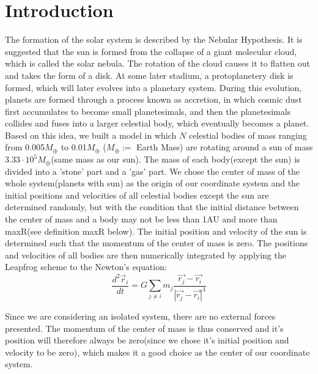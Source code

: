 \section{Introduction}
The formation of the solar system is described by the Nebular Hypothesis. It is suggested that the sun is formed from the collapse of a giant molecular cloud, which is called the solar nebula. The rotation of the cloud causes it to flatten out and takes the form of a disk. At some later stadium, a protoplanetery disk is formed, which will later evolves into a planetary system. During this evolution, planets are formed through a process known as accretion, in which cosmic dust first accumulates to become small planetesimals, and then the planetesimals collides and fuses into a larger celestial body, which eventually becomes a planet.\\

Based on this idea, we built a model in which $N$ celestial bodies of mass ranging from 0.005$M_{\oplus}$ to 0.01$M_{\oplus}$ ($M_{\oplus}:=$ Earth Mass) are rotating around a sun of mass $3.33\cdot 10^5 M_{\oplus}$(same mass as our sun). The mass of each body(except the sun) is divided into a 'stone' part and a 'gas' part. We chose the center of mass of the whole system(planets with sun) as the origin of our coordinate system and the initial positions and velocities of all celestial bodies except the sun are determined randomly, but with the condition that the initial distance between the center of mass and a body may not be less than 1AU and more than maxR(see definition maxR below). The initial position and velocity of the sun is determined such that the momentum of the center of mass is zero. The positions and velocities of all bodies are then numerically integrated by applying the Leapfrog scheme to the Newton's equation:
\[\frac{d^2\vec{r}_i}{dt}=G\sum_{j\neq i}m_j\frac{\vec{r_j}-\vec{r_i}}{|\vec{r_j}-\vec{r_i}|^3}\]

Since we are considering an isolated system, there are no external forces presented. The momentum of the center of mass is thus conserved and it's position will therefore always be zero(since we chose it's initial position and velocity to be zero), which makes it a good choice as the center of our coordinate system.\\


